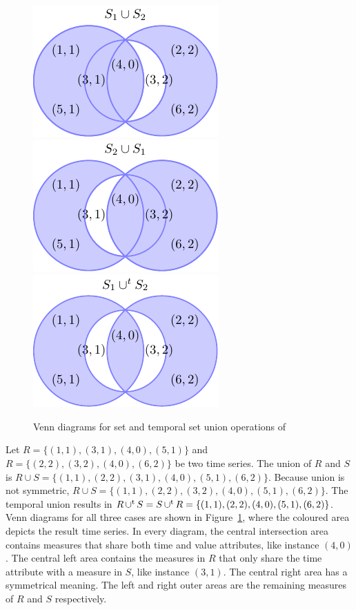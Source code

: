 \begin{figure}
  \centering
  \includegraphics{fig_model_venn.pdf}
  \includegraphics{fig_model_venn_reverse.pdf}
  \includegraphics{fig_model_venn2.pdf}
  \caption{Venn diagrams for set and temporal set union operations of
    }
  \label{fig:model:venn}
\end{figure}


\begin{example}\label{ex:model:s1s2}
  Let $R=\{(1,1), (3,1), (4,0), (5,1)\}$ and $R=\{(2,2), (3,2), (4,0),
  (6,2)\}$ be two time series. The union of $R$ and $S$ is $R\cup
  S=\{(1,1), (2,2), (3,1), (4,0), (5,1), (6,2)\}$. Because union is
  not symmetric, $R\cup S=\{(1,1), (2,2), \allowbreak(3,2), (4, 0), (5,1),
  (6,2)\}$. The temporal union results in $R\operatorname*{\cup^t} S= S \operatorname*{\cup^t}
  R=\{(1,1), (2,2), (4,0), (5,1), (6,2)\}$.  
  Venn diagrams for all three cases are shown in
  Figure~\ref{fig:model:venn}, where the coloured area depicts the
  result time series. In every diagram, the central intersection area
  contains measures that share both time and value attributes, like
  instance $(4,0)$. The central left area contains the measures in $R$
  that only share the time attribute with a measure in $S$, like
  instance $(3,1)$. The central right area has a symmetrical
  meaning. The left and right outer areas are the remaining measures
  of $R$ and $S$ respectively.
\end{example}




